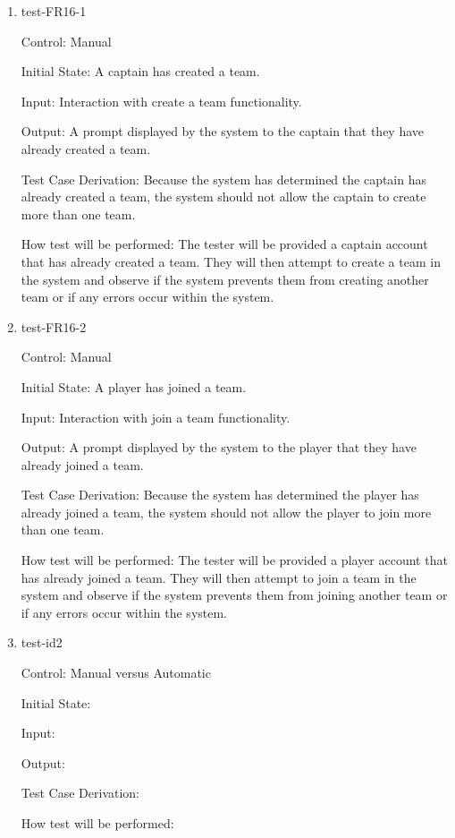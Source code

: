 \documentclass[12pt, titlepage]{article}
\begin{document}
\begin{enumerate}
\item{test-FR16-1\\}

Control: Manual
					
Initial State: A captain has created a team.
					
Input: Interaction with create a team functionality.
					
Output: A prompt displayed by the system to the captain that they have already created
a team.

Test Case Derivation: Because the system has determined the captain has already created a
team, the system should not allow the captain to create more than one team.
					
How test will be performed: The tester will be provided a captain account that has already
created a team. They will then attempt to create a team in the system and observe if the
system prevents them from creating another team or if any errors occur within the system.

\item{test-FR16-2\\}

Control: Manual
					
Initial State: A player has joined a team.
					
Input: Interaction with join a team functionality.
					
Output: A prompt displayed by the system to the player that they have already joined
a team.

Test Case Derivation: Because the system has determined the player has already joined a
team, the system should not allow the player to join more than one team.
					
How test will be performed: The tester will be provided a player account that has already
joined a team. They will then attempt to join a team in the system and observe if the
system prevents them from joining another team or if any errors occur within the system.

\item{test-id2\\}

Control: Manual versus Automatic
					
Initial State: 
					
Input: 
					
Output: 

Test Case Derivation: 

How test will be performed: 

\end{enumerate}
\end{document}
